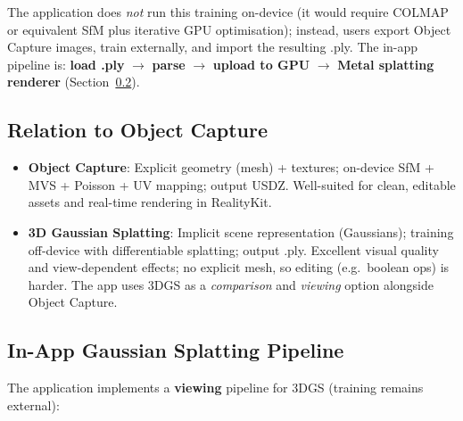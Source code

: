The application does \emph{not} run this training on-device (it would require COLMAP or equivalent SfM plus iterative GPU optimisation); instead, users export Object Capture images, train externally, and import the resulting .ply. The in-app pipeline is: \textbf{load .ply} $\rightarrow$ \textbf{parse} $\rightarrow$ \textbf{upload to GPU} $\rightarrow$ \textbf{Metal splatting renderer} (Section~\ref{sec:app_3dgs_pipeline}).

\subsection{Relation to Object Capture}

\begin{itemize}
    \item \textbf{Object Capture}: Explicit geometry (mesh) + textures; on-device SfM + MVS + Poisson + UV mapping; output USDZ. Well-suited for clean, editable assets and real-time rendering in RealityKit.
    \item \textbf{3D Gaussian Splatting}: Implicit scene representation (Gaussians); training off-device with differentiable splatting; output .ply. Excellent visual quality and view-dependent effects; no explicit mesh, so editing (e.g.\ boolean ops) is harder. The app uses 3DGS as a \emph{comparison} and \emph{viewing} option alongside Object Capture.
\end{itemize}

\subsection{In-App Gaussian Splatting Pipeline}
\label{sec:app_3dgs_pipeline}

The application implements a \textbf{viewing} pipeline for 3DGS (training remains external):

